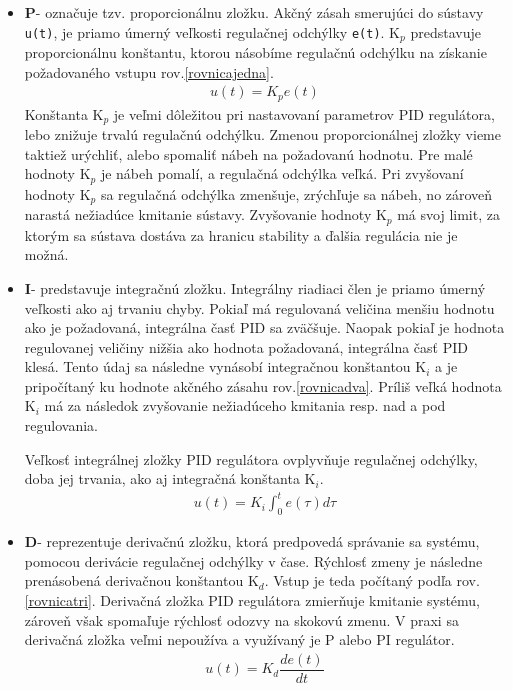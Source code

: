 \begin{itemize}
	\item \textbf{P}- označuje tzv. proporcionálnu zložku. Akčný zásah smerujúci do sústavy \verb|u(t)|, je priamo úmerný veľkosti regulačnej odchýlky \verb|e(t)|. K$_p$ predstavuje proporcionálnu konštantu, ktorou násobíme regulačnú odchýlku na získanie požadovaného vstupu rov.\ref{rovnicajedna}. 
	\begin{align}
		\label{rovnicajedna}
		u(t)=K_p e(t)
	\end{align}
	Konštanta K$_p$ je veľmi dôležitou pri nastavovaní parametrov PID regulátora, lebo znižuje trvalú regulačnú odchýlku. Zmenou proporcionálnej zložky vieme taktiež urýchliť, alebo spomaliť nábeh na požadovanú hodnotu. Pre malé hodnoty K$_p$ je nábeh pomalí, a regulačná odchýlka veľká. Pri zvyšovaní hodnoty K$_p$ sa regulačná odchýlka zmenšuje, zrýchľuje sa nábeh, no zároveň narastá nežiadúce kmitanie sústavy. Zvyšovanie hodnoty K$_p$ má svoj limit, za ktorým sa sústava dostáva za hranicu stability a ďalšia regulácia nie je možná. 
	
	\item \textbf{I}- predstavuje integračnú zložku. Integrálny riadiaci člen je priamo úmerný veľkosti ako aj trvaniu chyby. Pokiaľ má regulovaná veličina menšiu hodnotu ako je požadovaná, integrálna časť PID sa zväčšuje. Naopak pokiaľ je hodnota regulovanej veličiny nižšia ako hodnota požadovaná, integrálna časť PID klesá. Tento údaj sa následne vynásobí integračnou konštantou K$_i$ a je pripočítaný ku hodnote akčného zásahu rov.\ref{rovnicadva}. Príliš veľká hodnota K$_i$ má za následok zvyšovanie nežiadúceho kmitania resp. nad a pod regulovania. 
	
	Veľkosť integrálnej zložky PID regulátora ovplyvňuje regulačnej odchýlky, doba jej trvania, ako aj integračná konštanta K$_i$.
	\begin{align}
		\label{rovnicadva}
		u(t)=K_i  \int_{0}^{t} e(\tau)d\tau
	\end{align}

	\item \textbf{D}- reprezentuje derivačnú zložku, ktorá predpovedá správanie sa systému, pomocou derivácie regulačnej odchýlky v čase. Rýchlosť zmeny je následne prenásobená derivačnou konštantou K$_d$. Vstup je teda počítaný podľa rov.\ref{rovnicatri}. Derivačná zložka PID regulátora zmierňuje kmitanie systému, zároveň však spomaľuje rýchlosť odozvy na skokovú zmenu. V praxi sa derivačná zložka veľmi nepoužíva a využívaný je P alebo PI regulátor. 
	\begin{align}
		\label{rovnicatri}
		u(t)=K_d  \dfrac{de(t)}{dt}
	\end{align}
\end{itemize}

